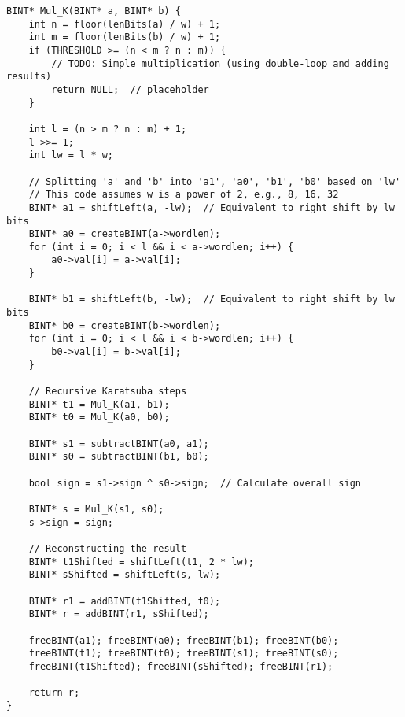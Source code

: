 \documentclass[12pt,openany]{book}
\theoremstyle{definition}
\begin{document}
	\vspace{20pt}
\begin{lstlisting}[style=sage, caption={Karatsuba C ver.},captionpos=t]
BINT* Mul_K(BINT* a, BINT* b) {
	int n = floor(lenBits(a) / w) + 1;
	int m = floor(lenBits(b) / w) + 1;
	if (THRESHOLD >= (n < m ? n : m)) {
		// TODO: Simple multiplication (using double-loop and adding results) 
		return NULL;  // placeholder
	}
	
	int l = (n > m ? n : m) + 1;
	l >>= 1;
	int lw = l * w;
	
	// Splitting 'a' and 'b' into 'a1', 'a0', 'b1', 'b0' based on 'lw'
	// This code assumes w is a power of 2, e.g., 8, 16, 32
	BINT* a1 = shiftLeft(a, -lw);  // Equivalent to right shift by lw bits
	BINT* a0 = createBINT(a->wordlen);
	for (int i = 0; i < l && i < a->wordlen; i++) {
		a0->val[i] = a->val[i];
	}
	
	BINT* b1 = shiftLeft(b, -lw);  // Equivalent to right shift by lw bits
	BINT* b0 = createBINT(b->wordlen);
	for (int i = 0; i < l && i < b->wordlen; i++) {
		b0->val[i] = b->val[i];
	}
	
	// Recursive Karatsuba steps
	BINT* t1 = Mul_K(a1, b1);
	BINT* t0 = Mul_K(a0, b0);
	
	BINT* s1 = subtractBINT(a0, a1);
	BINT* s0 = subtractBINT(b1, b0);
	
	bool sign = s1->sign ^ s0->sign;  // Calculate overall sign
	
	BINT* s = Mul_K(s1, s0);
	s->sign = sign;
	
	// Reconstructing the result
	BINT* t1Shifted = shiftLeft(t1, 2 * lw);
	BINT* sShifted = shiftLeft(s, lw);
	
	BINT* r1 = addBINT(t1Shifted, t0);
	BINT* r = addBINT(r1, sShifted);
	
	freeBINT(a1); freeBINT(a0); freeBINT(b1); freeBINT(b0);
	freeBINT(t1); freeBINT(t0); freeBINT(s1); freeBINT(s0);
	freeBINT(t1Shifted); freeBINT(sShifted); freeBINT(r1);
	
	return r;
}
\end{lstlisting}
\newpage
\end{document}
